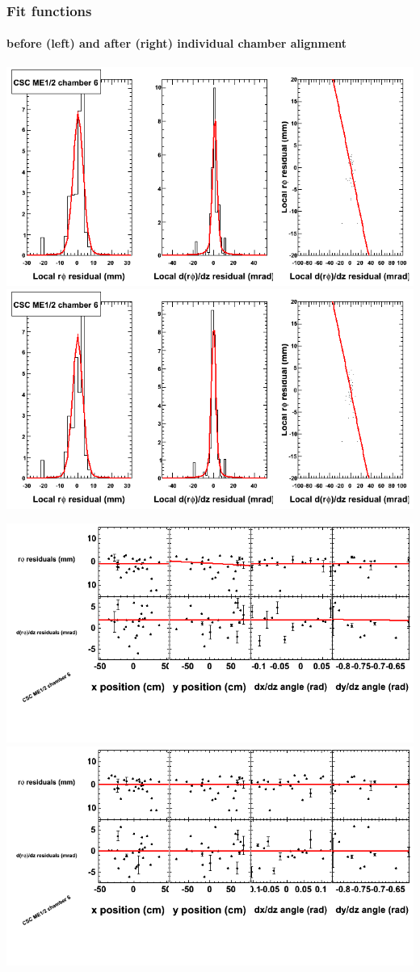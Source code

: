\documentclass[compress]{beamer}
\begin{document}
\begin{frame}
\frametitle{Fit functions}
\framesubtitle{before (left) and after (right) individual chamber alignment}
\includegraphics[width=0.5\linewidth]{ringfits_3dof/beforefit_MEp12_06_bellcurve.png} \includegraphics[width=0.5\linewidth]{ringfits_3dof/afterfit_MEp12_06_bellcurve.png}

\includegraphics[width=0.5\linewidth]{ringfits_3dof/beforefit_MEp12_06_polynomials.png} \includegraphics[width=0.5\linewidth]{ringfits_3dof/afterfit_MEp12_06_polynomials.png}
\end{frame}
\end{document}
